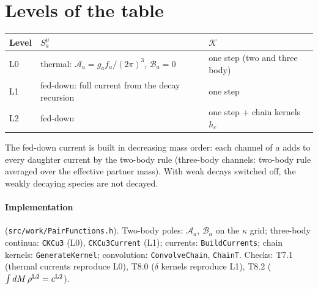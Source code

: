 \documentclass[11pt]{article}
\newcommand{\A}{\mathcal A}
\newcommand{\B}{\mathcal B}
\newcommand{\K}{\mathcal K}
\begin{document}
\section{Levels of the table}

\begin{center}
\begin{tabular}{@{}lll@{}}
\toprule
Level & $S_a^\mu$ & $\K$ \\
\midrule
L0 & thermal: $\A_a=g_af_a/(2\pi)^3$, $\B_a=0$ & one step (two and three body) \\
L1 & fed-down: full current from the decay recursion & one step \\
L2 & fed-down & one step $+$ chain kernels $h_c$ \\
\bottomrule
\end{tabular}
\end{center}

The fed-down current is built in decreasing mass order: each channel of $a$ adds to every daughter
current by the two-body rule (three-body channels: two-body rule averaged over the effective partner
mass). With weak decays switched off, the weakly decaying species are not decayed.

\paragraph{Implementation} (\texttt{src/work/PairFunctions.h}). Two-body poles: $\A_a$, $\B_a$ on the
$\kappa$ grid; three-body continua: \texttt{CKCu3} (L0), \texttt{CKCu3Current} (L1); currents:
\texttt{BuildCurrents}; chain kernels: \texttt{GenerateKernel}; convolution: \texttt{ConvolveChain},
\texttt{ChainT}. Checks: T7.1 (thermal currents reproduce L0), T8.0 ($\delta$ kernels reproduce L1),
T8.2 ($\int dM\,\rho^{\rm L2}=c^{\rm L2}$).
\end{document}
